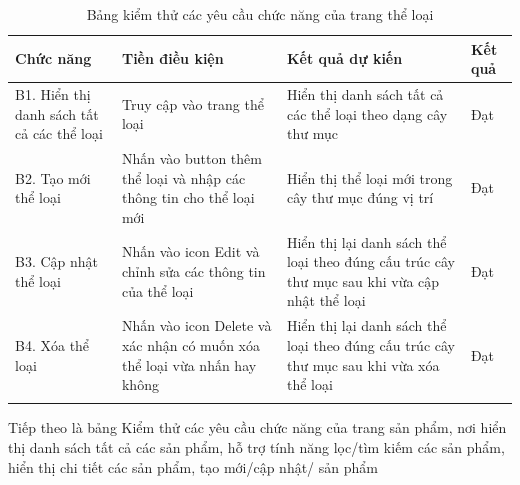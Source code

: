 \begin{longtable}{|p{4cm}|p{4cm}|p{4cm}|p{2cm}|}
    \hline
    Chức năng & Tiền điều kiện & Kết quả dự kiến & Kết quả \\
    \hline
    B1. Hiển thị danh sách tất cả các thể loại& Truy cập vào trang thể loại & Hiển thị danh sách tất cả các thể loại theo dạng cây thư mục & Đạt\\
    \hline
     B2. Tạo mới thể loại & Nhấn vào button thêm thể loại và nhập các thông tin cho thể loại mới  & Hiển thị thể loại mới trong cây thư mục đúng vị trí & Đạt\\
    \hline
     B3. Cập nhật thể loại & Nhấn vào icon Edit và chỉnh sửa các thông tin của thể loại & Hiển thị lại danh sách thể loại theo đúng cấu trúc cây thư mục sau khi vừa cập nhật thể loại  & Đạt\\
    \hline
    B4. Xóa thể loại & Nhấn vào icon Delete và xác nhận có muốn xóa thể loại vừa nhấn hay không & Hiển thị lại danh sách thể loại theo đúng cấu trúc cây thư mục sau khi vừa xóa thể loại & Đạt\\
    \hline
    \caption{Bảng kiểm thử các yêu cầu chức năng của trang thể loại}
\end{longtable}
Tiếp theo là bảng Kiểm thử các yêu cầu chức năng của trang sản phẩm, nơi hiển thị danh sách tất cả các sản phẩm, hỗ trợ tính năng lọc/tìm kiếm các sản phẩm, hiển thị chi tiết các sản phẩm, tạo mới/cập nhật/ sản phẩm

